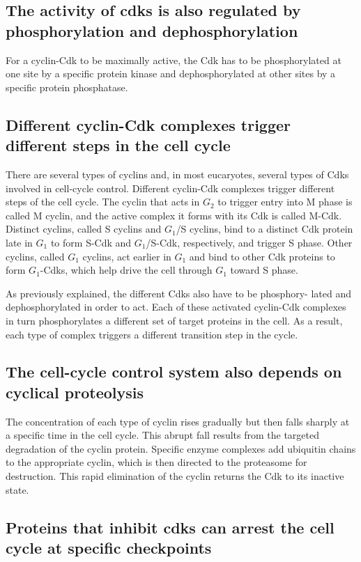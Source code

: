 \subsection{The activity of cdks is also regulated by phosphorylation and dephosphorylation}

For a cyclin-Cdk to be maximally active, the Cdk has to be
phosphorylated at one site by a specific protein kinase and dephosphorylated
at other sites by a specific protein phosphatase.

\subsection{Different cyclin-Cdk complexes trigger different steps in the cell cycle}

There are several types of cyclins and, in most eucaryotes, several types
of Cdks involved in cell-cycle control. Different cyclin-Cdk complexes
trigger different steps of the cell cycle. The cyclin that acts in $G_2$ to trigger
entry into M phase is called M cyclin, and the active complex it forms
with its Cdk is called M-Cdk. Distinct cyclins, called S cyclins and $G_1$/S
cyclins, bind to a distinct Cdk protein late in $G_1$ to form S-Cdk and $G_1$/S-Cdk,
respectively, and trigger S phase. Other cyclins, called $G_1$ cyclins, act earlier
in $G_1$ and bind to other Cdk proteins to form $G_1$-Cdks, which help drive
the cell through $G_1$ toward S phase.

As previously explained, the different Cdks also have to be phosphory-
lated and dephosphorylated in order to act. Each of
these activated cyclin-Cdk complexes in turn phosphorylates a different
set of target proteins in the cell. As a result, each type of complex triggers
a different transition step in the cycle.

\subsection{The cell-cycle control system also depends on cyclical proteolysis}

The concentration of each type of cyclin rises gradually but then falls
sharply at a specific time in the cell cycle. This abrupt
fall results from the targeted degradation of the cyclin protein. Specific
enzyme complexes add ubiquitin chains to the appropriate cyclin, which
is then directed to the proteasome for destruction. This
rapid elimination of the cyclin returns the Cdk to its inactive state.

\subsection{Proteins that inhibit cdks can arrest the cell cycle at specific checkpoints}

